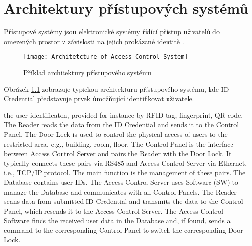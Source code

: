 \chapter{Architektury přístupových systémů}
Přístupové systémy jsou elektronické systémy řídící přístup uživatelů do omezených prostor v závislosti na jejich prokázané identitě \cite{accessControlSystem_eiprocus}.

\begin{figure}[!h]
    \centering
    \texttt{[image: Architetcture-of-Access-Control-System]}
    \caption{Příklad architektury přístupového systému \cite{accessControlSystem_eiprocus}}
    \label{fig:Access control system architecture}
\end{figure}

Obrázek \ref{fig:Access control system architecture} zobrazuje typickou architekturu přístupového systému, kde ID Credential představuje prvek ůmožňující identifikovat uživatele.

the user identificaton, provided for instance by RFID tag, fingerprint, QR code.
The Reader reads the data from the ID Credential and sends it to the Control Panel.
The Door Lock is used to control the physical access of users to the restricted area, e.g., building, room, floor.
The Control Panel is the interface between Access Control Server and pairs the Reader with the Door Lock. It typically connects these pairs via RS485 and Access Control Server via Ethernet, i.e., TCP/IP protocol. The main function is the management of these pairs.
The Database contains user IDs.
The Access Control Server uses Software (SW) to manage the Database and communicates with all Control Panels.
The Reader scans data from submitted ID Credential and transmits the data to the Control Panel, which resends it to the Access Control Server.
The Access Control Software finds the received user data in the Database and, if found, sends a command to the corresponding Control Panel to switch the corresponding Door Lock.
